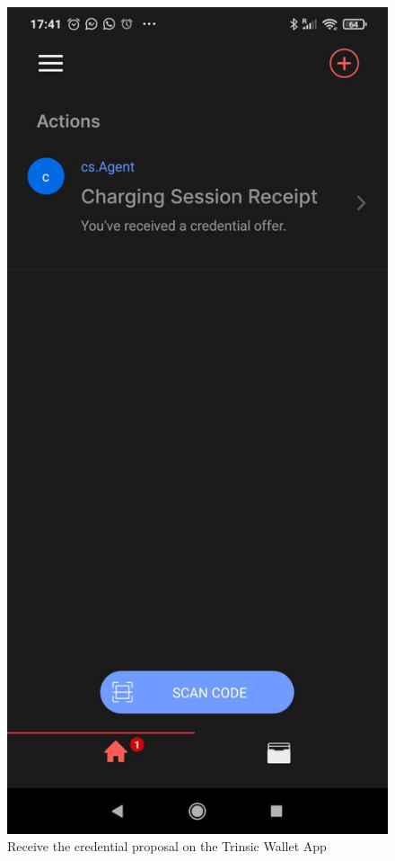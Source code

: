 \begin{figure}[H]
\centering
\begin{minipage}{.33\textwidth}
  \centering
  \includegraphics[width=.9\linewidth]{images/Frontend/Charging/14.0.jpeg}
  \caption[]{Receive the credential proposal on the Trinsic Wallet App}
  \label{fig:charging_screenshot_14.0}

\end{minipage}
\end{figure}
